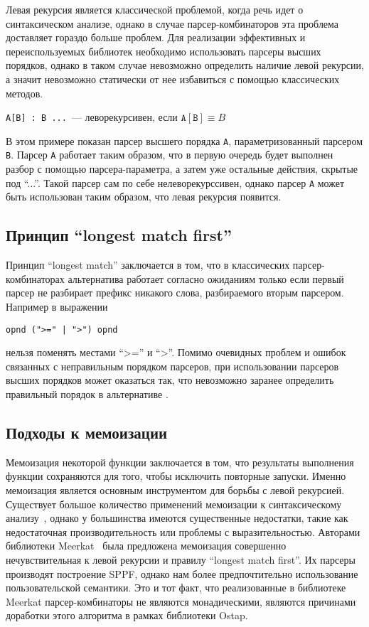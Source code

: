 \documentclass[conference]{IEEEtran}
\begin{document}
Левая рекурсия является классической проблемой, когда речь идет о синтаксическом анализе, однако в случае парсер-комбинаторов эта проблема доставляет гораздо больше проблем.
Для реализации эффективных и переиспользуемых библиотек необходимо использовать парсеры высших порядков, однако в таком случае невозможно определить наличие левой рекурсии,
а значит невозможно статически от нее избавиться с помощью классических методов.

\begin{center}
    \texttt{A[B] : B ...}~--- леворекурсивен, если $\mathtt{A[B]} \equiv B$
  \end{center}

В этом примере показан парсер высшего порядка \lstinline|А|, параметризованный парсером \lstinline|B|. Парсер \lstinline|А| работает таким образом, что в первую очередь будет
выполнен разбор с помощью парсера-параметра, а затем уже остальные действия, скрытые под ``...''. Такой парсер сам по себе нелеворекурссивен, однако парсер \lstinline|А| может
быть использован таким образом, что левая рекурсия появится.

\subsection{Принцип ``longest match first''}

Принцип ``longest match'' заключается в том, что в классических парсер-комбинаторах альтернатива работает согласно ожиданиям только если первый парсер не разбирает префикс
никакого слова, разбираемого вторым парсером. Например в выражении

  \begin{center}
    \verb/opnd (">=" | ">") opnd/
  \end{center}

нельзя поменять местами ``>='' и ``>''. Помимо очевидных проблем и ошибок связанных с неправильным порядком парсеров, при использовании парсеров высших порядков может оказаться так,
что невозможно заранее определить правильный порядок в альтернативе
.
\subsection{Подходы к мемоизации}
Мемоизация некоторой функции заключается в том, что результаты выполнения функции сохраняются для того, чтобы исключить повторные запуски. Именно мемоизация является основным инструментом
для борьбы с левой рекурсией. Существует большое количество применений мемоизации к синтаксическому анализу~\cite{frost,tratt,warth}, однако у большинства имеются существенные недостатки,
 такие как недостаточная производительность или проблемы с выразительностью. Авторами библиотеки Meerkat~\cite{meerkat} была предложена мемоизация совершенно нечувствительная к левой
 рекурсии и правилу ``longest match first''. Их парсеры производят построение SPPF, однако нам более предпочтительно использование пользовательской семантики. Это и тот факт, что реализованные
 в библиотеке Meerkat парсер-комбинаторы не являются монадическими, являются причинами доработки этого алгоритма в рамках библиотеки Ostap.
\end{document}
